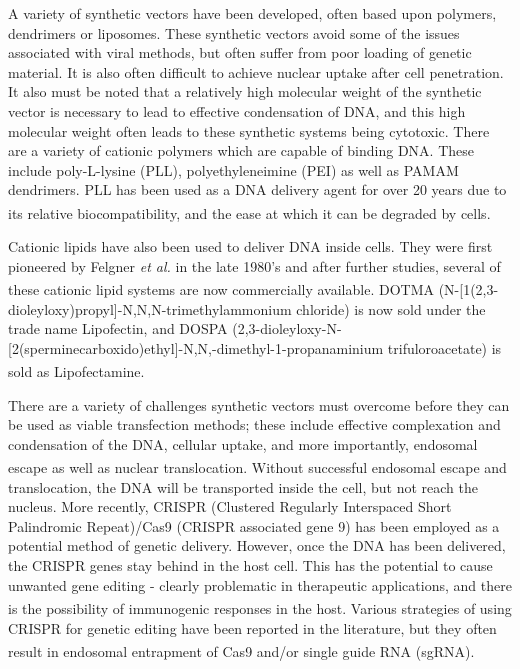 A variety of synthetic vectors have been developed, often based upon polymers, dendrimers or liposomes.  These synthetic vectors avoid some of the issues associated with viral methods, but often suffer from poor loading of genetic material. It is also often difficult to achieve nuclear uptake after cell penetration. It also must be noted that a relatively high molecular weight of the synthetic vector is necessary to lead to effective condensation of DNA, and this high molecular weight often leads to these synthetic systems being cytotoxic.  
There are a variety of cationic polymers which are capable of binding DNA. These include poly-L-lysine (PLL), polyethyleneimine (PEI) as well as PAMAM dendrimers. PLL has been used as a DNA delivery agent for over 20 years due to its relative biocompatibility, and the ease at which it can be degraded by cells.\textsuperscript{\cite{Zauner1998Polylysine-basedDelivery}}  

Cationic lipids have also been used to deliver DNA inside cells. They were first pioneered by Felgner \textit{et al.} in the late 1980's and after further studies, several of these cationic lipid systems are now commercially available.\textsuperscript{\cite{Felgner1987Lipofection:Procedure,Malone1989CationicTransfection}}  
DOTMA (N-[1(2,3-dioleyloxy)propyl]-N,N,N-trimethylammonium chloride) is now sold under the trade name Lipofectin, and DOSPA (2,3-dioleyloxy-N-[2(sperminecarboxido)ethyl]-N,N,-dimethyl-1-propanaminium trifuloroacetate) is sold as Lipofectamine.\textsuperscript{\cite{LipofectinTransfectionReagent-ThermoFisherScientificHttps://www.thermofisher.com/order/catalog/product/18292037,LipofectamineReagent-ThermoFisherScientificHttps://www.thermofisher.com/uk/en/home/brands/product-brand/lipofectamine.html}} 

There are a variety of challenges synthetic vectors must overcome before they can be used as viable transfection methods; these include effective complexation and condensation of the DNA, cellular uptake, and more importantly, endosomal escape as well as nuclear translocation.\textsuperscript{\cite{Ghosh2008EfficientNanoparticles}} Without successful endosomal escape and translocation, the DNA will be transported inside the cell, but not reach the nucleus. 
More recently, CRISPR (Clustered Regularly Interspaced Short Palindromic Repeat)/Cas9 (CRISPR associated gene 9) has been employed as a potential method of genetic delivery. However, once the DNA has been delivered, the CRISPR genes stay behind in the host cell. This has the potential to cause unwanted gene editing - clearly problematic in therapeutic applications, and there is the possibility of immunogenic responses in the host.\textsuperscript{\cite{Mout2017DirectEditing}} 
Various strategies of using CRISPR for genetic editing have been reported in the literature, but they often result in endosomal entrapment of Cas9 and/or single guide RNA (sgRNA).\textsuperscript{\cite{Sun2015Self-AssembledEditing,Zuris2015CationicVivo}}

